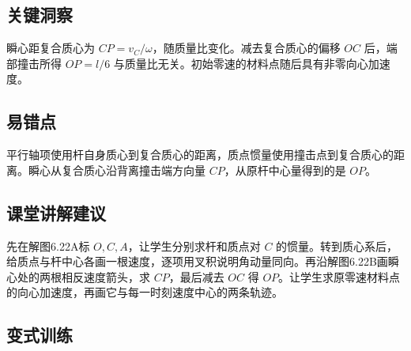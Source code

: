 \documentclass[UTF8,fontset=fandol,a4paper,11pt]{ctexart}
\begin{document}


\subsection*{关键洞察}

瞬心距复合质心为 $CP=v_C/\omega$，随质量比变化。减去复合质心的偏移 $OC$ 后，端部撞击所得 $OP=l/6$ 与质量比无关。初始零速的材料点随后具有非零向心加速度。



\subsection*{易错点}

平行轴项使用杆自身质心到复合质心的距离，质点惯量使用撞击点到复合质心的距离。瞬心从复合质心沿背离撞击端方向量 $CP$，从原杆中心量得到的是 $OP$。



\subsection*{课堂讲解建议}

先在解图6.22A标 $O,C,A$，让学生分别求杆和质点对 $C$ 的惯量。转到质心系后，给质点与杆中心各画一根速度，逐项用叉积说明角动量同向。再沿解图6.22B画瞬心处的两根相反速度箭头，求 $CP$，最后减去 $OC$ 得 $OP$。让学生求原零速材料点的向心加速度，再画它与每一时刻速度中心的两条轨迹。




\subsection*{变式训练}
\end{document}
